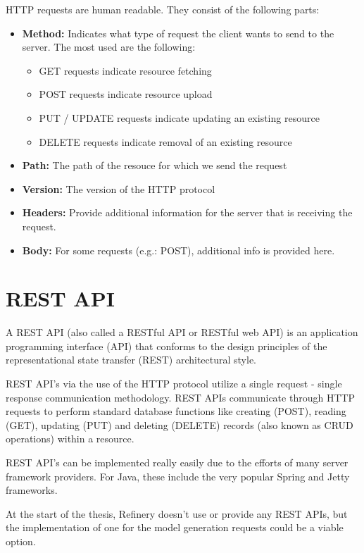	HTTP requests are human readable. They consist of the following parts:
	\begin{itemize}
		\item \textbf{Method:} Indicates what type of request the client wants to send to the server. The most used are the following:
		\begin{itemize}
			\item GET requests indicate resource fetching
			\item POST requests indicate resource upload 
			\item PUT / UPDATE requests indicate updating an existing resource
			\item DELETE requests indicate removal of an existing resource
		\end{itemize} 
		\item \textbf{Path:} The path of the resouce for which we send the request 
		\item \textbf{Version:} The version of the HTTP protocol
		\item \textbf{Headers:} Provide additional information for the server that is receiving the request. 
		\item \textbf{Body:} For some requests (e.g.: POST), additional info is provided here.
	\end{itemize}

\section{REST API}
	A REST API \cite{restapi} (also called a RESTful API or RESTful web API) is an application programming interface (API) that conforms to the design principles of 
	the representational state transfer (REST) architectural style. 

	REST API's via the use of the HTTP protocol utilize a single request - single response communication methodology.
	REST APIs communicate through HTTP requests to perform standard database functions like creating (POST), reading (GET),
	updating (PUT) and deleting (DELETE) records (also known as CRUD operations) within a resource.

	REST API's can be implemented really easily due to the efforts of many server framework providers. For Java, these include 
	the very popular Spring and Jetty frameworks. 

	At the start of the thesis, Refinery doesn't use or provide any REST APIs, but the implementation of one for the model 
	generation requests could be a viable option.

